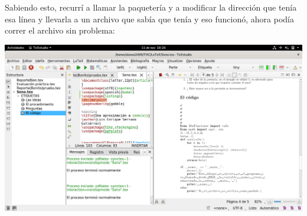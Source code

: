 \documentclass[french]{article}
\begin{document}
Sabiendo esto, recurrí a llamar la paquetería y a modificar la dirección que tenía esa línea y llevarla a un archivo que sabía que tenía y eso funcionó, ahora podía correr el archivo sin problema:

\includegraphics[scale=0.20]{Imagenes/ER1.png}
\end{document}
